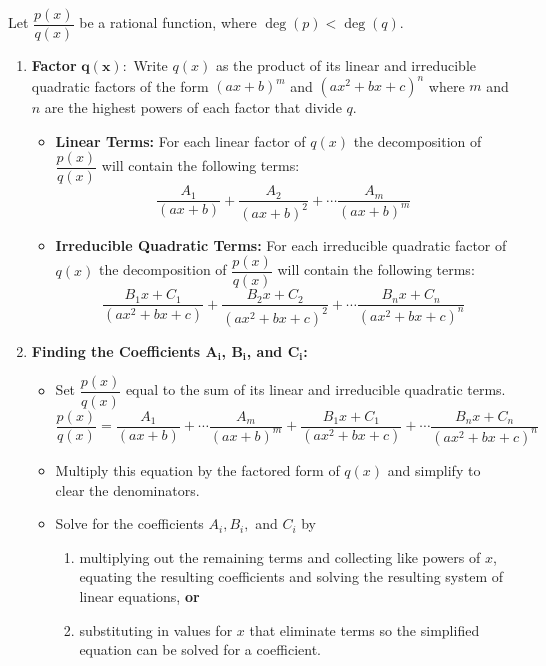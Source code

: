 {
\begin{keyidea}\label{idea:partial_fraction}%
Let $\dfrac{p(x)}{q(x)}$ be a rational function, where $\deg(p)<\deg(q)$.
\begin{enumerate}
	\item \textbf {Factor} $\mathbf{q(x):}$ Write $q(x)$ as the product of its linear and irreducible quadratic factors of the form $(ax+b)^m$ and $(ax^2+bx+c)^n$ where $m$ and $n$ are the highest powers of each factor that divide $q$.
	\begin{itemize}
		\item \textbf{Linear Terms:} For each linear factor of $q(x)$ the decomposition of $\dfrac{p(x)}{q(x)}$ will contain the following terms:
		\[\frac{A_1}{(ax+b)}+\frac {A_2}{(ax+b)^2}+\dotsb\frac{A_m}{(ax+b)^m}\]
		\item \textbf{Irreducible Quadratic Terms:}  For each irreducible quadratic factor of $q(x)$ the decomposition of $\dfrac {p(x)}{q(x)}$ will contain the following terms:
		\[
		 \dfrac{B_1x+C_1}{(ax^2+bx+c)}+\frac{B_2x+C_2}{(ax^2+bx+c)^2}
		 +\dotsb\frac{B_nx+C_n}{(ax^2+bx+c)^n}
		\]
	\end{itemize}
	\item \textbf{Finding the Coefficients $\mathbf{A_i}$, $\mathbf{B_i}$, and $\mathbf{C_i}$:}
	\begin{itemize}
		\item Set $\dfrac{p(x)}{q(x)}$ equal to the sum of its linear and irreducible quadratic terms.
		\[
		 \frac{p(x)}{q(x)}
		 =\frac{A_1}{(ax+b)}+\dotsb\frac{A_m}{(ax+b)^m}
		 +\frac{B_1x+C_1}{(ax^2+bx+c)}+\dotsb\frac{B_nx+C_n}{(ax^2+bx+c)^n}
		\]
		\item Multiply this equation by the factored form of $q(x)$ and simplify to clear the denominators. 
		\item Solve for the coefficients $A_i, B_i,$ and $C_i$ by
		\begin{enumerate}
			\item multiplying out the remaining terms and collecting like powers of $x$, equating the resulting coefficients and solving the resulting system of linear equations, \textbf{or}
			\item substituting in values for $x$ that eliminate terms so the simplified equation can be solved for a coefficient.
		\end{enumerate}
	\end{itemize}
\end{enumerate}
\end{keyidea}
}

